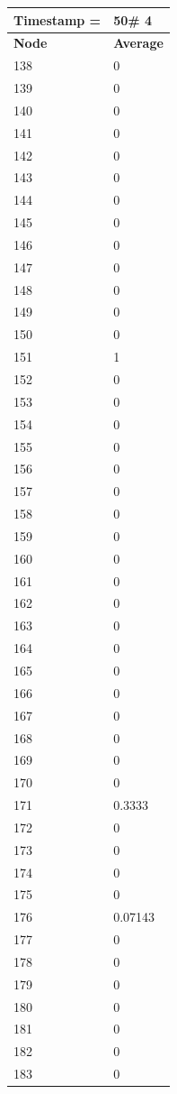 \begin{tabular}{|l||l|}
\hline
\textbf{Timestamp =} & \textbf{50}\# 4\\\hline
	\textbf{Node} & \textbf{Average} \\ \hline
\hline
	138 & 0 \\ \hline
	139 & 0 \\ \hline
	140 & 0 \\ \hline
	141 & 0 \\ \hline
	142 & 0 \\ \hline
	143 & 0 \\ \hline
	144 & 0 \\ \hline
	145 & 0 \\ \hline
	146 & 0 \\ \hline
	147 & 0 \\ \hline
	148 & 0 \\ \hline
	149 & 0 \\ \hline
	150 & 0 \\ \hline
	151 & 1 \\ \hline
	152 & 0 \\ \hline
	153 & 0 \\ \hline
	154 & 0 \\ \hline
	155 & 0 \\ \hline
	156 & 0 \\ \hline
	157 & 0 \\ \hline
	158 & 0 \\ \hline
	159 & 0 \\ \hline
	160 & 0 \\ \hline
	161 & 0 \\ \hline
	162 & 0 \\ \hline
	163 & 0 \\ \hline
	164 & 0 \\ \hline
	165 & 0 \\ \hline
	166 & 0 \\ \hline
	167 & 0 \\ \hline
	168 & 0 \\ \hline
	169 & 0 \\ \hline
	170 & 0 \\ \hline
	171 & 0.3333 \\ \hline
	172 & 0 \\ \hline
	173 & 0 \\ \hline
	174 & 0 \\ \hline
	175 & 0 \\ \hline
	176 & 0.07143 \\ \hline
	177 & 0 \\ \hline
	178 & 0 \\ \hline
	179 & 0 \\ \hline
	180 & 0 \\ \hline
	181 & 0 \\ \hline
	182 & 0 \\ \hline
	183 & 0 \\ \hline
\end{tabular}

